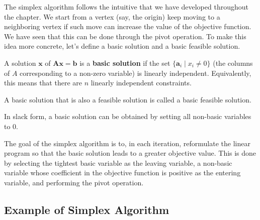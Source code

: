 The simplex algorithm follows the intuitive that we have developed throughout the chapter. We start from a vertex (say, the origin) keep moving to a neighboring vertex if such move can increase the value of the objective function. We have seen that this can be done through the pivot operation. To make this idea more concrete, let's define a basic solution and a basic feasible solution.

\begin{definition} 
    A solution $\mathbf{x}$ of $\mathbf{A}\mathbf{x} = \mathbf{b}$ is a \textbf{basic solution} if the set $\{ \mathbf{a}_i \mid x_i \neq 0 \}$ (the columns of $A$ corresponding to a non-zero variable) is linearly independent. Equivalently, this means that there are $n$ linearly independent constraints.
\end{definition}

\begin{definition} 
    A basic solution that is also a feasible solution is called a basic feasible solution.
\end{definition}

In slack form, a basic solution can be obtained by setting all non-basic variables to 0.

The goal of the simplex algorithm is to, in each iteration, reformulate the linear program so that the basic solution leads to a greater objective value. This is done by selecting the tightest basic variable as the leaving variable, a non-basic variable whose coefficient in the objective function is positive as the entering variable, and performing the pivot operation.

\subsection{Example of Simplex Algorithm}

